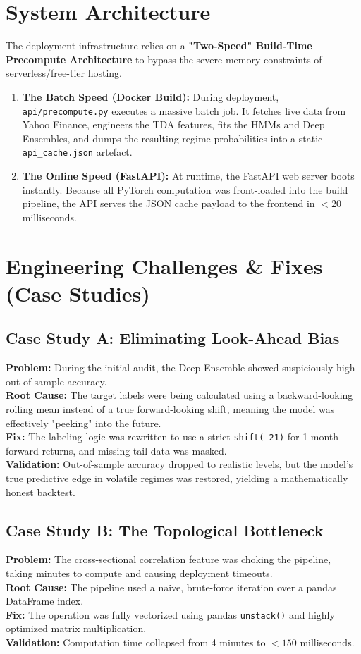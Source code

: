 \documentclass[11pt,a4paper]{article}
\begin{document}
\section{System Architecture}
The deployment infrastructure relies on a \textbf{"Two-Speed" Build-Time Precompute Architecture} to bypass the severe memory constraints of serverless/free-tier hosting.

\begin{enumerate}
    \item \textbf{The Batch Speed (Docker Build):} During deployment, \texttt{api/precompute.py} executes a massive batch job. It fetches live data from Yahoo Finance, engineers the TDA features, fits the HMMs and Deep Ensembles, and dumps the resulting regime probabilities into a static \texttt{api\_cache.json} artefact.
    \item \textbf{The Online Speed (FastAPI):} At runtime, the FastAPI web server boots instantly. Because all PyTorch computation was front-loaded into the build pipeline, the API serves the JSON cache payload to the frontend in $<20$ milliseconds.
\end{enumerate}

\section{Engineering Challenges \& Fixes (Case Studies)}

\subsection{Case Study A: Eliminating Look-Ahead Bias}
\textbf{Problem:} During the initial audit, the Deep Ensemble showed suspiciously high out-of-sample accuracy.\\
\textbf{Root Cause:} The target labels were being calculated using a backward-looking rolling mean instead of a true forward-looking shift, meaning the model was effectively "peeking" into the future.\\
\textbf{Fix:} The labeling logic was rewritten to use a strict \texttt{shift(-21)} for 1-month forward returns, and missing tail data was masked.\\
\textbf{Validation:} Out-of-sample accuracy dropped to realistic levels, but the model's true predictive edge in volatile regimes was restored, yielding a mathematically honest backtest.

\subsection{Case Study B: The Topological Bottleneck}
\textbf{Problem:} The cross-sectional correlation feature was choking the pipeline, taking minutes to compute and causing deployment timeouts.\\
\textbf{Root Cause:} The pipeline used a naive, brute-force iteration over a pandas DataFrame index.\\
\textbf{Fix:} The operation was fully vectorized using pandas \texttt{unstack()} and highly optimized matrix multiplication.\\
\textbf{Validation:} Computation time collapsed from 4 minutes to $<150$ milliseconds.
\end{document}
